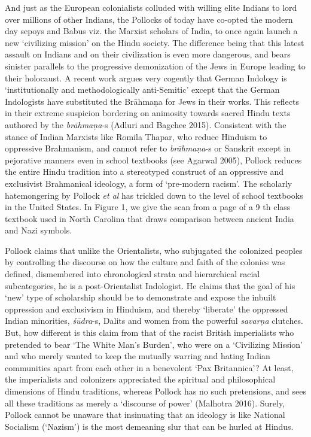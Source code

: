 And just as the European colonialists colluded with willing elite Indians to lord over millions of other Indians, the Pollocks of today have co-opted the modern day sepoys and Babus viz. the Marxist scholars of India, to once again launch a new ‘civilizing mission’ on the Hindu society. The difference being that this latest assault on Indians and on their civilization is even more dangerous, and bears sinister parallels to the progressive demonization of the Jews in Europe leading to their holocaust. A recent work argues very cogently that German Indology is ‘institutionally and methodologically anti-Semitic’ except that the German Indologists have substituted the Brāhmaṇa for Jews in their works. This reflects in their extreme suspicion bordering on animosity towards sacred Hindu texts authored by the \textit{brāhmaṇa}-s (Adluri and Bagchee 2015). Consistent with the stance of Indian Marxists like Romila Thapar, who reduce Hinduism to oppressive Brahmanism, and cannot refer to \textit{brāhmaṇa}-s or Sanskrit except in pejorative manners even in school textbooks (see Agarwal 2005), Pollock reduces the entire Hindu tradition into a stereotyped construct of an oppressive and exclusivist Brahmanical ideology, a form of ‘pre-modern racism’. The scholarly hatemongering by Pollock \textit{et al} has trickled down to the level of school textbooks in the United States. In Figure 1, we give the scan from a page of a 9 th class textbook used in North Carolina that draws comparison between ancient India and Nazi symbols.

Pollock claims that unlike the Orientalists, who subjugated the colonized peoples by controlling the discourse on how the culture and faith of the colonies was defined, dismembered into chronological strata and hierarchical racial subcategories, he is a post-Orientalist Indologist. He claims that the goal of his ‘new’ type of scholarship should be to demonstrate and expose the inbuilt oppression and exclusivism in Hinduism, and thereby ‘liberate’ the oppressed Indian minorities, \textit{śūdra}-s, Dalits and women from the powerful \textit{savarṇa} clutches. But, how different is this claim from that of the racist British imperialists who pretended to bear ‘The White Man’s Burden’, who were on a ‘Civilizing Mission’ and who merely wanted to keep the mutually warring and hating Indian communities apart from each other in a benevolent ‘Pax Britannica’? At least, the imperialists and colonizers appreciated the spiritual and philosophical dimensions of Hindu traditions, whereas Pollock has no such pretensions, and sees all these traditions as merely a ‘discourse of power’ (Malhotra 2016). Surely, Pollock cannot be unaware that insinuating that an ideology is like National Socialism (‘Nazism’) is the most demeaning slur that can be hurled at Hindus.

